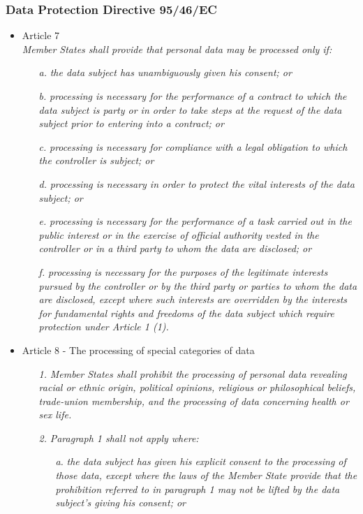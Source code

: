 \documentclass[11pt]{article}
\newcommand{\DPD}{Data Protection Directive }
\begin{document}
\subsubsection{\DPD 95/46/EC}
\begin{itemize}
	\item Article 7\\
		\emph{Member States shall provide that personal data may be processed only if:}
			\begin{itemize}
				\item  [\textit{a.}] {\it the data subject has unambiguously given his consent; or}
				\item  [\textit{b.}] {\it processing is necessary for the performance of a contract to which the data subject is party or in order to take steps at the request of the data subject prior to entering into a contract; or}
				\item  [\textit{c.}] {\it processing is necessary for compliance with a legal obligation to which the controller is subject; or}
				\item  [\textit{d.}] {\it processing is necessary in order to protect the vital interests of the data subject; or}
				\item  [\textit{e.}] {\it processing is necessary for the performance of a task carried out in the public interest or in the exercise of official authority vested in the controller or in a third party to whom the data are disclosed; or}
				\item  [\textit{f.}] {\it processing is necessary for the purposes of the legitimate interests pursued by the controller or by the third party or parties to whom the data are disclosed, except where such interests are overridden by the interests for fundamental rights and freedoms of the data subject which require protection under Article 1 (1).}
			\end{itemize}

	\item Article 8 - The processing of special categories of data\\
		\begin{itemize}
			\item  [\textit{1.}] {\it Member States shall prohibit the processing of personal data revealing racial or ethnic origin, political opinions, religious or philosophical beliefs, trade-union membership, and the processing of data concerning health or sex life.}
			\item  [\textit{2.}] {\it Paragraph 1 shall not apply where:}
			\begin{itemize}
				\item  [\textit{a.}] {\it the data subject has given his explicit consent to the processing of those data, except where the laws of the Member State provide that the prohibition referred to in paragraph 1 may not be lifted by the data subject's giving his consent; or}		\end{itemize}


\end{itemize}
\end{itemize}
\end{document}
